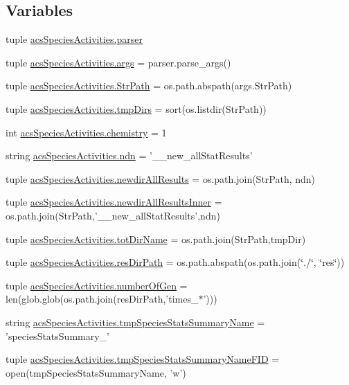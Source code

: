 \subsection*{Variables}
\begin{DoxyCompactItemize}
\item 
tuple \hyperlink{a00131_aab55eec317b77f6c91a884938a106d3f}{acs\+Species\+Activities.\+parser}
\item 
tuple \hyperlink{a00131_a2dd673f2cf596c509afd7ad0f3df286b}{acs\+Species\+Activities.\+args} = parser.\+parse\+\_\+args()
\item 
tuple \hyperlink{a00131_a05f0f829ce4df27678aa19d4e5f10c54}{acs\+Species\+Activities.\+Str\+Path} = os.\+path.\+abspath(args.\+Str\+Path)
\item 
tuple \hyperlink{a00131_addf4c61c6afe70a2ea39931695ddc36b}{acs\+Species\+Activities.\+tmp\+Dirs} = sort(os.\+listdir(Str\+Path))
\item 
int \hyperlink{a00131_a5459c566e6ccdf02747a3c16089a5593}{acs\+Species\+Activities.\+chemistry} = 1
\item 
string \hyperlink{a00131_ad2a87ed28d0f42525ce49c390f390298}{acs\+Species\+Activities.\+ndn} = '\+\_\+\_\+new\+\_\+all\+Stat\+Results'
\item 
tuple \hyperlink{a00131_a4fc28291b7f61ee2fa8969fa7a690ba2}{acs\+Species\+Activities.\+newdir\+All\+Results} = os.\+path.\+join(Str\+Path, ndn)
\item 
tuple \hyperlink{a00131_ae77a5ce35739a29f29f9df698d91f1c9}{acs\+Species\+Activities.\+newdir\+All\+Results\+Inner} = os.\+path.\+join(Str\+Path,'\+\_\+\_\+new\+\_\+all\+Stat\+Results',ndn)
\item 
tuple \hyperlink{a00131_aa71c948cf1d0699207eafcd30beb394e}{acs\+Species\+Activities.\+tot\+Dir\+Name} = os.\+path.\+join(Str\+Path,tmp\+Dir)
\item 
tuple \hyperlink{a00131_a2c1728d3ec9815ec7cf41653e953524c}{acs\+Species\+Activities.\+res\+Dir\+Path} = os.\+path.\+abspath(os.\+path.\+join(\char`\"{}./\char`\"{}, \char`\"{}res\char`\"{}))
\item 
tuple \hyperlink{a00131_acceae37ca98ccf6dc25c9f538fda386f}{acs\+Species\+Activities.\+number\+Of\+Gen} = len(glob.\+glob(os.\+path.\+join(res\+Dir\+Path,'times\+\_\+$\ast$')))
\item 
string \hyperlink{a00131_aceab16acbf85893dcacfcfd921c9da12}{acs\+Species\+Activities.\+tmp\+Species\+Stats\+Summary\+Name} = 'species\+Stats\+Summary\+\_\+'
\item 
tuple \hyperlink{a00131_a57b362cf15dda461a59c719a92177c3a}{acs\+Species\+Activities.\+tmp\+Species\+Stats\+Summary\+Name\+F\+I\+D} = open(tmp\+Species\+Stats\+Summary\+Name, 'w')

\end{DoxyCompactItemize}
